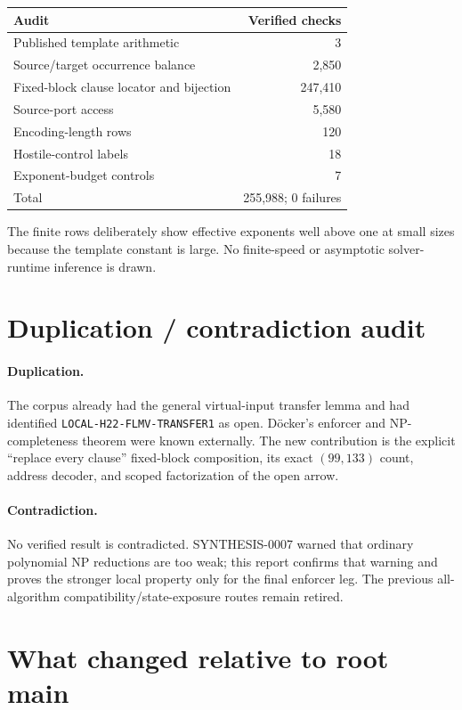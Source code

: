 \documentclass[11pt]{article}
\begin{document}
\begin{center}
\begin{tabular}{@{}lr@{}}
\toprule
Audit & Verified checks\\
\midrule
Published template arithmetic & 3\\
Source/target occurrence balance & 2,850\\
Fixed-block clause locator and bijection & 247,410\\
Source-port access & 5,580\\
Encoding-length rows & 120\\
Hostile-control labels & 18\\
Exponent-budget controls & 7\\
\midrule
Total & 255,988; 0 failures\\
\bottomrule
\end{tabular}
\end{center}

The finite rows deliberately show effective exponents well above one at
small sizes because the template constant is large.  No finite-speed or
asymptotic solver-runtime inference is drawn.

\section{Duplication / contradiction audit}

\paragraph{Duplication.}
The corpus already had the general virtual-input transfer lemma and had
identified \texttt{LOCAL-H22-FLMV-TRANSFER1} as open.  D\"ocker's enforcer and
NP-completeness theorem were known externally.  The new contribution is the
explicit ``replace every clause'' fixed-block composition, its exact
$(99,133)$ count, address decoder, and scoped factorization of the open arrow.

\paragraph{Contradiction.}
No verified result is contradicted.  SYNTHESIS-0007 warned that ordinary
polynomial NP reductions are too weak; this report confirms that warning and
proves the stronger local property only for the final enforcer leg.  The
previous all-algorithm compatibility/state-exposure routes remain retired.

\section{What changed relative to root main}
\end{document}
